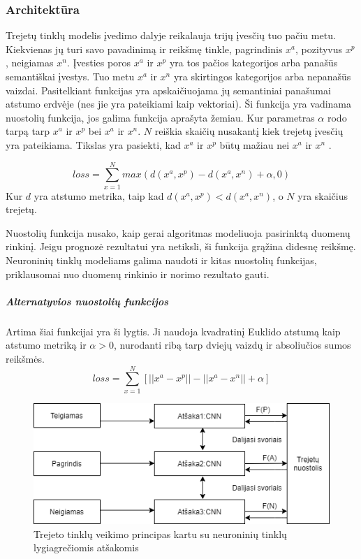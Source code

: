 \documentclass{VUMIFPSkursinis}
\begin{document}
\subsubsection{Architektūra}
Trejetų tinklų modelis įvedimo dalyje reikalauja trijų įvesčių tuo pačiu metu. Kiekvienas jų turi savo pavadinimą ir reikšmę tinkle, pagrindinis $x^a$, pozityvus $x^p$, neigiamas $x^n$. Įvesties poros $x^a$ ir $x^p$ yra tos pačios kategorijos arba panašūs semantiškai įvestys. Tuo metu $x^a$ ir $x^n$ yra skirtingos kategorijos arba nepanašūs vaizdai. Pasitelkiant funkcijas yra apskaičiuojama jų semantiniai panašumai atstumo erdvėje (nes jie yra pateikiami kaip vektoriai). Ši funkcija yra vadinama nuostolių funkcija, jos galima funkcija aprašyta žemiau. Kur parametras $\alpha$ rodo tarpą tarp $x^a$ ir $x^p$ bei $x^a$ ir $x^n$. $N$ reiškia skaičių nusakantį kiek trejetų įvesčių yra pateikiama. Tikslas yra pasiekti, kad $x^a$ ir $x^p$ būtų mažiau nei $x^a$ ir $x^n$ \cite{Face_recognition}.

\[loss = \sum_{x=1}^{N} max(d(x^a, x^p) - d(x^a, x^n) + \alpha, 0)\]
Kur $d$ yra atstumo metrika, taip kad $d(x^a, x^p) < d(x^a, x^n)$, o $N$ yra skaičius trejetų.

Nuostolių funkcija nusako, kaip gerai algoritmas modeliuoja pasirinktą duomenų rinkinį. Jeigu prognozė rezultatui yra netiksli, ši funkcija grąžina didesnę reikšmę. Neuroninių tinklų modeliams galima naudoti ir kitas nuostolių funkcijas, priklausomai nuo duomenų rinkinio ir norimo rezultato gauti.

\subparagraph{Alternatyvios nuostolių funkcijos}
Artima šiai funkcijai yra ši lygtis. Ji naudoja kvadratinį Euklido  \cite{Aerial_image_similarity} atstumą kaip atstumo metriką ir $\alpha > 0$, nurodanti ribą tarp dviejų vaizdų ir absoliučios sumos reikšmės.
\[loss = \sum_{x=1}^{N} [||x^a - x^p|| - ||x^a - x^n|| + \alpha]\]

\begin{figure}[H]
\centering
\includegraphics[scale=0.8]{img/Triplet_network_branchCNN}
\caption{Trejeto tinklų veikimo principas kartu su neuroninių tinklų lygiagrečiomis atšakomis} %
\label{img:mlp}
\end{figure}
\end{document}
